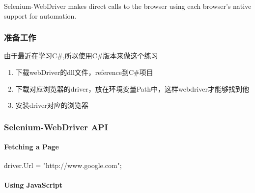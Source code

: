 Selenium-WebDriver makes direct calls to the browser using each browser’s native support for automation.

\subsubsection{准备工作}

由于最近在学习C#,所以使用C#版本来做这个练习
\begin{enumerate}
\item 下载webDriver的dll文件，reference到C#项目
\item 下载对应浏览器的driver，放在环境变量Path中，这样webdriver才能够找到他
\item 安装driver对应的浏览器
\end{enumerate}

\subsubsection{Selenium-WebDriver API}

\paragraph{Fetching a Page}
\begin{CSharp}
driver.Url = "http://www.google.com";
\end{CSharp}

\paragraph{Using JavaScript}